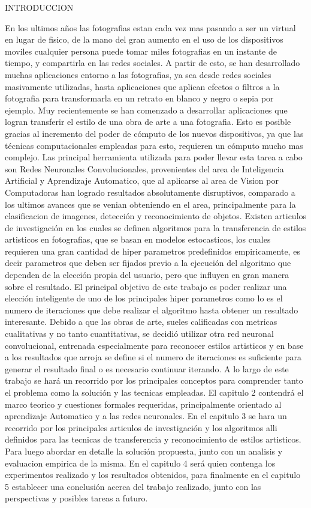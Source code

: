 INTRODUCCION

En los ultimos años las fotografias estan cada vez mas pasando a ser un virtual en lugar de fisico, de la mano del gran aumento en el uso de los dispositivos moviles 
cualquier persona puede tomar miles fotografias en un instante de tiempo, y compartirla en las redes sociales.
A partir de esto, se han desarrollado muchas aplicaciones entorno a las fotografias, ya sea desde redes sociales masivamente utilizadas, hasta aplicaciones que aplican efectos o filtros 
a la fotografia para transformarla en un retrato en blanco y negro o sepia por ejemplo.
Muy recientemente se han comenzado a desarrollar aplicaciones que logran transferir el estilo de una obra de arte a una fotografia. Esto es posible gracias al incremento 
del poder de cómputo de los nuevos dispositivos, ya que las técnicas computacionales empleadas para esto, requieren un cómputo mucho mas complejo.
Las principal herramienta utilizada para poder llevar esta tarea a cabo son Redes Neuronales Convolucionales, provenientes del area de  
Inteligencia Artificial y Aprendizaje Automatico, que al aplicarse al area de Vision por Computadoras han logrado resultados absolutamente disruptivos, 
comparado a los ultimos avances que se venian obteniendo en el area, principalmente para la clasificacion de imagenes, detección y reconocimiento de objetos.
Existen articulos de investigación en los cuales se definen algoritmos para la transferencia de estilos artisticos en fotografias, que se basan en modelos estocasticos, 
los cuales requieren una gran cantidad de hiper parametros predefinidos empiricamente, es decir parametros que deben ser fijados previo a la ejecución del algoritmo que dependen 
de la elección propia del usuario, pero que influyen en gran manera sobre el resultado.
El principal objetivo de este trabajo es poder realizar una elección inteligente de uno de los principales hiper parametros como lo es el numero de iteraciones 
que debe realizar el algoritmo hasta obtener un resultado interesante.
Debido a que las obras de arte, sueles calificadas con metricas cualitativas y no tanto cuantitativas, se decidió utilizar otra red neuronal convolucional, 
entrenada especialmente para reconocer estilos artisticos y en base a los resultados que arroja se define si el numero de iteraciones es suficiente para generar el resultado final 
o es necesario continuar iterando.
A lo largo de este trabajo se hará un recorrido por los principales conceptos para comprender tanto el problema como la solución y las tecnicas empleadas.
El capitulo 2 contendrá el marco teorico y cuestiones formales requeridas, principalmente orientado al aprendizaje Automatico y a las redes neuronales.
En el capitulo 3 se hara un recorrido por los principales articulos de investigación y los algoritmos alli definidos para las tecnicas de transferencia y reconocimiento de estilos artisticos.
Para luego abordar en detalle la solución propuesta, junto con un analisis y evaluacion empirica de la misma.
En el capitulo 4 será quien contenga los experimentos realizado y los resultados obtenidos, para finalmente en el capitulo 5 establecer una conclusión acerca del trabajo realizado, 
junto con las perspectivas y posibles tareas a futuro.


